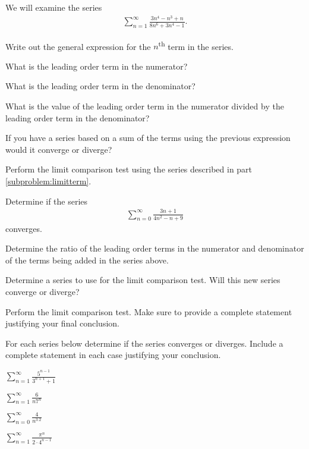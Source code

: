 \begin{problem}
  \item We will examine the series
  \begin{eqnarray*}
    \sum^\infty_{n=1} \frac{3n^4 - n^3 + n}{8n^6 + 3n^4 - 1}.
  \end{eqnarray*}
  \begin{subproblem}
      \item Write out the general expression for the $n$\textsuperscript{th} term in the series.
      \vfill
      \item What is the leading order term in the numerator?
      \vfill
      \item What is the leading order term in the denominator?
      \vfill
      \item What is the value of the leading order term in the numerator divided by the leading order term in the denominator?
      \vfill
      \clearpage
      \item If you have a series based on a sum of the terms using the previous expression would it converge or diverge?
      \label{subproblem:limitterm}
      \vfill
      \item Perform the limit comparison test using the series described in part \ref{subproblem:limitterm}.
      \vfill
      \vfill
      \vfill
  \end{subproblem}
  \clearpage
  \item Determine if the series
  \begin{eqnarray*}
    \sum^\infty_{n=0} \frac{3n+1}{4n^2-n+9}
  \end{eqnarray*}
  converges.
  \begin{subproblem}
    \item  Determine the ratio of the leading order terms in the numerator and denominator of the terms being added in the series above.
    \vfill
    \item Determine a series to use for the limit comparison test. Will this new series converge or diverge?
    \vfill
    \item Perform the limit comparison test.  Make sure to provide a complete statement justifying your final conclusion.
    \vfill
    \vfill
    \vfill
  \end{subproblem}

  \clearpage

\item For each series below determine if the series converges or diverges. Include a complete statement in each case justifying your conclusion.
  \begin{subproblem}
    \item $\sum_{n=1}^\infty \frac{5^{n-1}}{3^{n+1}+1}$
      \vfill
    \item $\sum_{n=1}^\infty \frac{6}{n7^n}$
      \vfill
      \clearpage
    \item $\sum_{n=0}^\infty \frac{4}{n^{3.2}} $
      \vfill
    \item $\sum_{n=1}^\infty \frac{\pi^n}{2\cdot 4^{n-1}}$
      \vfill
      \clearpage
  \end{subproblem}
\end{problem}


